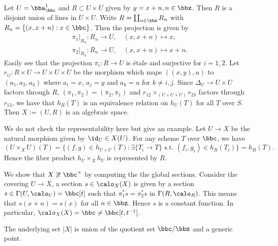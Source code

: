     \begin{example}\label{eg:C/Z_as_algebraic_space}
        Let \(U = \bba_\bbc^1\) and \(R \subset U \times U\) given by \(y=x+n, n \in \bbz\).
        Then \(R\) is a disjoint union of lines in \(U \times U\).
        Write \(R = \coprod_{n\in \bbz} R_n\) with \(R_n = \{(x,x+n): x \in \bbc\}\).
        Then the projection is given by 
        \begin{align*}
            &\pi_1|_{R_n}:R_n \to U, \quad (x,x+n) \mapsto x, \\
            &\pi_2|_{R_n}:R_n \to U, \quad (x,x+n) \mapsto x+n.
        \end{align*} 
        Easily see that the projection \(\pi_i: R \to U\) is \'etale and surjective for \(i=1,2\).
        Let \(r_{ij}:R \times U \to U \times U \times U\) be the morphism which maps \(((x,y),u)\) to \((a_1,a_2,a_3)\) where \(a_i = x\), \(a_j = y\) and \(a_k = u\) for \(k \neq i,j\).
        Since \(\Delta_U \to U\times U\) factors through \(R\), \((\pi_1,\pi_2) = (\pi_2,\pi_1)\) and 
        \(r_{12} \times_{(U\times U\times U)} r_{23}\) factors through \(r_{13}\), 
        we have that \(h_R(T)\) is an equivalence relation on \(h_U(T)\) for all \(T\) over \(S\).
        Then \(X := (U,R)\) is an algebraic space.
        
        We do not check the representability here but give an example.
        Let \(U \to X\) be the natural morphism given by \(\id_U \in X(U)\).
        For any scheme \(T\) over \(\bbc\), we have
        \[ (U\times_X U)(T) = \{(f,g) \in h_{U\times U}(T): \exists \{T_i \to T\} \text{ s.t. } (f_i,g_i) \in h_R(T_i) \} = h_R(T). \]
        Hence the fiber product \(h_U \times_X h_U\) is represented by \(R\).
        
        We show that \(X \not\cong \bbc^{\times}\) by computing the the global sections.
        Consider the covering \(U \to X\), a section \(s \in \calo_X(X)\) is given by a section \(s \in \Gamma(U,\calo_U) = \bbc[t]\) such that \(\pi_1^*s = \pi_2^*s\) in \(\Gamma(R,\calo_R)\).
        This means that \(s(x+n) = s(x)\) for all \(n \in \bbz\).
        Hence \(s\) is a constant function.
        In particular, \(\calo_X(X) = \bbc \neq \bbc[t,t^{-1}]\).

        The underlying set \(|X|\) is union of the quotient set \(\bbc/\bbz\) and a generic point.
    \end{example}

